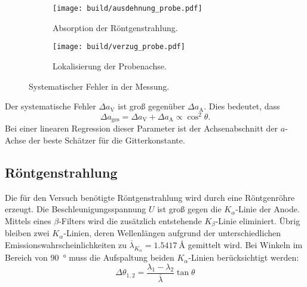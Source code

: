 \begin{figure}
  \centering
  \begin{subfigure}[b]{0.48\textwidth}
    \centering
    \texttt{[image: build/ausdehnung\_probe.pdf]}
    \caption{%
      Absorption der Röntgenstrahlung.
    }%
    \label{fig:fehler_absorption}
  \end{subfigure}
  \begin{subfigure}[b]{0.48\textwidth}
    \centering
    \texttt{[image: build/verzug\_probe.pdf]}
    \caption{%
      Lokalisierung der Probenachse.
    }%
    \label{fig:fehler_lokalisation}
  \end{subfigure}
  \caption{%
    Systematischer Fehler in der Messung.\cite{anleitung}
  }
\end{figure}

Der systematische Fehler $\Delta a_\text{V}$ ist groß gegenüber $\Delta a_\text{A}$.
Dies bedeutet, dass
\begin{equation}
  \Delta a_\text{ges} = \Delta a_\text{V} + \Delta a_\text{A} \propto \cos^2\!{\theta}.
\end{equation}
Bei einer linearen Regression dieser Parameter ist
der Achsenabschnitt der $a$-Achse der beste Schätzer für die Gitterkonstante.


\subsection{Röntgenstrahlung}%
\label{sub:roentgenstrahlung}
Die für den Versuch benötigte Röntgenstrahlung wird durch eine Röntgenröhre erzeugt.
Die Beschleunigungsspannung $U$ ist groß gegen die $K_\alpha$-Linie der Anode.
Mittels eines $\beta$-Filters wird die zusätzlich entstehende $K_\beta$-Linie eliminiert.
Übrig bleiben zwei $K_\alpha$-Linien, deren Wellenlängen aufgrund der unterschiedlichen
Emissionswahrscheinlichkeiten zu $\overline{\lambda}_{K_\alpha} = \SI{1.5417}{\angstrom}$
gemittelt wird.
Bei Winkeln im Bereich von \SI{90}{\degree} muss die Aufspaltung beiden $K_\alpha$-Linien
berücksichtigt werden:
\begin{equation}
  \Delta \theta_{1, 2} = \frac{\lambda_1 - \lambda_2}{\overline{\lambda}} \tan{\theta}
\end{equation}

